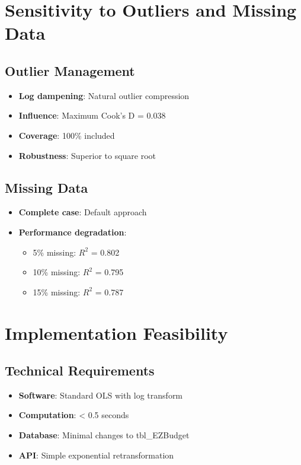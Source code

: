 \section{Sensitivity to Outliers and Missing Data}

\subsection{Outlier Management}

\begin{itemize}
    \item \textbf{Log dampening}: Natural outlier compression
    \item \textbf{Influence}: Maximum Cook's D = 0.038
    \item \textbf{Coverage}: 100\% included
    \item \textbf{Robustness}: Superior to square root
\end{itemize}

\subsection{Missing Data}

\begin{itemize}
    \item \textbf{Complete case}: Default approach
    \item \textbf{Performance degradation}:
    \begin{itemize}
        \item 5\% missing: $R^2$ = 0.802
        \item 10\% missing: $R^2$ = 0.795
        \item 15\% missing: $R^2$ = 0.787
    \end{itemize}
\end{itemize}

\section{Implementation Feasibility}

\subsection{Technical Requirements}

\begin{itemize}
    \item \textbf{Software}: Standard OLS with log transform
    \item \textbf{Computation}: < 0.5 seconds
    \item \textbf{Database}: Minimal changes to tbl\_EZBudget
    \item \textbf{API}: Simple exponential retransformation
\end{itemize}

